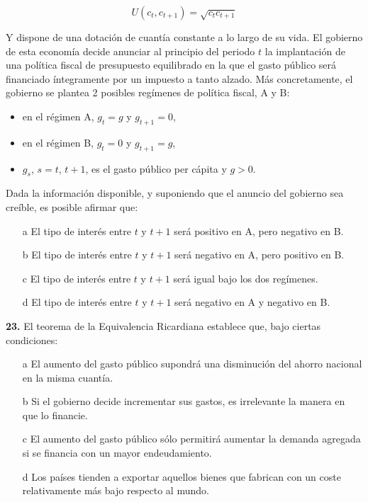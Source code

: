 \documentclass{nuevotema}
\begin{document}
\begin{equation*}
U(c_t, c_{t+1}) = \sqrt{c_t c_{t+1}}
\end{equation*}

Y dispone de una dotación de cuantía constante a lo largo de su vida. El gobierno de esta economía decide anunciar al principio del periodo $t$ la implantación de una política fiscal de presupuesto equilibrado en la que el gasto público será financiado íntegramente por un impuesto a tanto alzado. Más concretamente, el gobierno se plantea 2 posibles regímenes de política fiscal, A y B:

\begin{itemize}
	\item en el régimen A, $g_t = g$ y $g_{t+1} = 0$,
	\item en el régimen B, $g_t = 0$ y $g_{t+1} = g$,
	\item $g_s$, $s=t$, $t+1$, es el gasto público per cápita y $g>0$.
\end{itemize}

Dada la información disponible, y suponiendo que el anuncio del gobierno sea creíble, es posible afirmar que:

\begin{itemize}
	\item[a] El tipo de interés entre $t$ y $t+1$ será positivo en A, pero negativo en B.
	\item[b] El tipo de interés entre $t$ y $t+1$ será negativo en A, pero positivo en B.
	\item[c] El tipo de interés entre $t$ y $t+1$ será igual bajo los dos regímenes.
	\item[d] El tipo de interés entre $t$ y $t+1$ será negativo en A y negativo en B.
\end{itemize}


\textbf{23.} El teorema de la Equivalencia Ricardiana establece que, bajo ciertas condiciones:

\begin{itemize}
	\item[a] El aumento del gasto público supondrá una disminución del ahorro nacional en la misma cuantía.
	\item[b] Si el gobierno decide incrementar sus gastos, es irrelevante la manera en que lo financie.
	\item[c] El aumento del gasto público sólo permitirá aumentar la demanda agregada si se financia con un mayor endeudamiento.
	\item[d] Los países tienden a exportar aquellos bienes que fabrican con un coste relativamente más bajo respecto al mundo.
\end{itemize}
\end{document}
